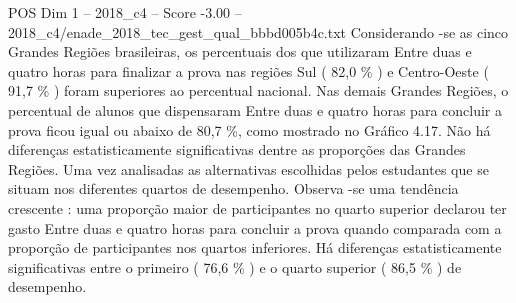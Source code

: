 \begin{textsample}{POS Dim 1 – 2018\_c4 – Score -3.00 – 2018\_c4/enade\_2018\_tec\_gest\_qual\_bbbd005b4c.txt}
Considerando -se as cinco Grandes Regiões brasileiras, os percentuais dos que utilizaram Entre duas e quatro horas para finalizar a prova nas regiões Sul ( 82,0 \% ) e Centro-Oeste ( 91,7 \% ) foram superiores ao percentual nacional.
Nas demais Grandes Regiões, o percentual de alunos que dispensaram Entre duas e quatro horas para concluir a prova ficou igual ou abaixo de 80,7 \%, como mostrado no Gráfico 4.17.
Não há diferenças estatisticamente significativas dentre as proporções das Grandes Regiões.
Uma vez analisadas as alternativas escolhidas pelos estudantes que se situam nos diferentes quartos de desempenho.
Observa -se uma tendência crescente : uma proporção maior de participantes no quarto superior declarou ter gasto Entre duas e quatro horas para concluir a prova quando comparada com a proporção de participantes nos quartos inferiores.
Há diferenças estatisticamente significativas entre o primeiro ( 76,6 \% ) e o quarto superior ( 86,5 \% ) de desempenho.

\end{textsample}
